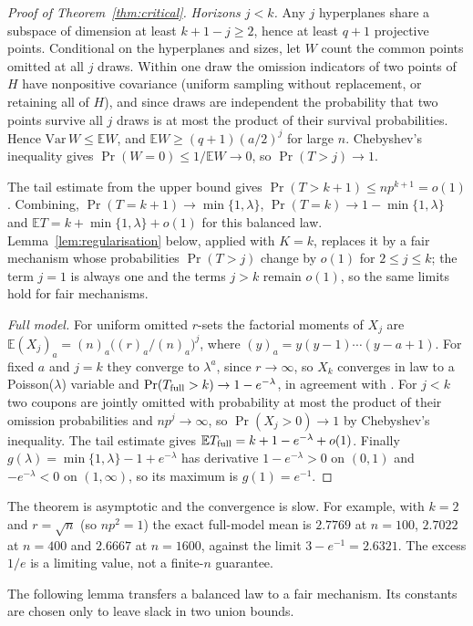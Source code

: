 \documentclass[11pt,a4paper]{article}
\theoremstyle{remark}
\newcommand{\E}{\mathbb E}
\begin{document}
\begin{proof}[Proof of Theorem~\ref{thm:critical}]
\emph{Horizons $j<k$.} Any $j$ hyperplanes share a subspace of dimension at least $k+1-j\ge2$, hence at least $q+1$ projective points. Conditional on the hyperplanes and sizes, let $W$ count the common points omitted at all $j$ draws. Within one draw the omission indicators of two points of $H$ have nonpositive covariance (uniform sampling without replacement, or retaining all of $H$), and since draws are independent the probability that two points survive all $j$ draws is at most the product of their survival probabilities. Hence $\mathrm{Var}\,W\le\E W$, and $\E W\ge(q+1)(a/2)^j$ for large $n$. Chebyshev's inequality gives $\Pr(W=0)\le1/\E W\to0$, so $\Pr(T>j)\to1$.

The tail estimate from the upper bound gives $\Pr(T>k+1)\le np^{k+1}=o(1)$. Combining, $\Pr(T=k+1)\to\min\{1,\lambda\}$, $\Pr(T=k)\to1-\min\{1,\lambda\}$ and $\E T=k+\min\{1,\lambda\}+o(1)$ for this balanced law. Lemma~\ref{lem:regularisation} below, applied with $K=k$, replaces it by a fair mechanism whose probabilities $\Pr(T>j)$ change by $o(1)$ for $2\le j\le k$; the term $j=1$ is always one and the terms $j>k$ remain $o(1)$, so the same limits hold for fair mechanisms.

\emph{Full model.} For uniform omitted $r$-sets the factorial moments of $X_j$ are $\E(X_j)_a=(n)_a\big((r)_a/(n)_a\big)^j$, where $(y)_a=y(y-1)\cdots(y-a+1)$. For fixed $a$ and $j=k$ they converge to $\lambda^a$, since $r\to\infty$, so $X_k$ converges in law to a Poisson($\lambda$) variable and $\Pr(T_{\rm full}>k)\to1-e^{-\lambda}$, in agreement with \cite{berend-asym}. For $j<k$ two coupons are jointly omitted with probability at most the product of their omission probabilities and $np^j\to\infty$, so $\Pr(X_j>0)\to1$ by Chebyshev's inequality. The tail estimate gives $\E T_{\rm full}=k+1-e^{-\lambda}+o(1)$. Finally $g(\lambda)=\min\{1,\lambda\}-1+e^{-\lambda}$ has derivative $1-e^{-\lambda}>0$ on $(0,1)$ and $-e^{-\lambda}<0$ on $(1,\infty)$, so its maximum is $g(1)=e^{-1}$.
\end{proof}

The theorem is asymptotic and the convergence is slow. For example, with $k=2$ and $r=\sqrt n$ (so $np^2=1$) the exact full-model mean is $2.7769$ at $n=100$, $2.7022$ at $n=400$ and $2.6667$ at $n=1600$, against the limit $3-e^{-1}=2.6321$. The excess $1/e$ is a limiting value, not a finite-$n$ guarantee.

The following lemma transfers a balanced law to a fair mechanism. Its constants are chosen only to leave slack in two union bounds.
\end{document}
